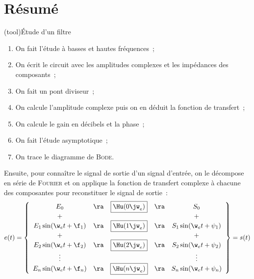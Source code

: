 \documentclass[../../main/main.tex]{subfiles}
\begin{document}
\section{Résumé}
\begin{tcb*}(tool){Étude d'un filtre}
	\begin{enumerate}
		\item On fait l'étude à basses et hautes fréquences~;
		\item On écrit le circuit avec les amplitudes complexes et les impédances des
		      composants~;
		\item On fait un pont diviseur~;
		\item On calcule l'amplitude complexe puis on en déduit la fonction de
		      transfert~;
		\item On calcule le gain en décibels et la phase~;
		\item On fait l'étude asymptotique~;
		\item On trace le diagramme de \textsc{Bode}.
	\end{enumerate}
	Ensuite, pour connaître le signal de sortie d'un signal d'entrée, on le
	décompose en série de \textsc{Fourier} et on applique la fonction de transfert
	complexe à chacune des composantes pour reconstituer le signal de sortie~:
	\[
		e(t) =
		\left\{
		\begin{array}{ccccc}
			E_0                    & \ra & \fbox{$\Hu(0\jw_e)$} & \ra & S_0
			\\
			+                      &     &                      &     & +
			\\
			E_1\sin(\w_e t + \f_1) & \ra & \fbox{$\Hu(1\jw_e)$} & \ra & S_1\sin(\w_e t + \psi_1)
			\\
			+                      &     &                      &     & +
			\\
			E_2\sin(\w_e t + \f_2) & \ra & \fbox{$\Hu(2\jw_e)$} & \ra & S_2\sin(\w_e t + \psi_2)
			\\
			\vdots                 &     &                      &     & \vdots
			\\
			E_n\sin(\w_e t + \f_n) & \ra & \fbox{$\Hu(n\jw_e)$} & \ra & S_n\sin(\w_e t + \psi_n)
		\end{array}
		\right\} = s(t)
	\]
\end{tcb*}
\end{document}
